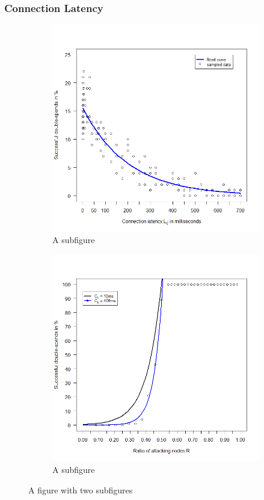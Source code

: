 \documentclass[a4paper,12pt,twoside]{report}
\begin{document}
\subsubsection{Connection Latency}
\begin{figure}
\centering
\begin{subfigure}{.5\textwidth}
  \centering
  \includegraphics[width=\linewidth]{Experiments/ConnLatency/connection.png}
  \caption{A subfigure}
  \label{fig:sub1}
\end{subfigure}%
\begin{subfigure}{.5\textwidth}
  \centering
  \includegraphics[width=\linewidth]{Experiments/ConnLatency/conrat.png}
  \caption{A subfigure}
  \label{fig:sub2}
\end{subfigure}
\caption{A figure with two subfigures}
\label{fig:test}
\end{figure}
\end{document}
